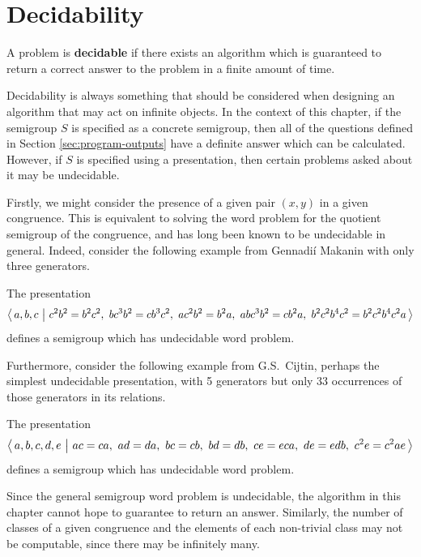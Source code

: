 \section{Decidability}
\label{sec:decidability}

\begin{definition}
  \label{def:decidable}
  A problem is \textbf{decidable} if there exists an algorithm which is
  guaranteed to return a correct answer to the problem in a finite amount of
  time.
\end{definition}

Decidability is always something that should be considered when designing an
algorithm that may act on infinite objects.  In the context of this chapter, if
the semigroup $S$ is specified as a concrete semigroup, then all of the
questions defined in Section \ref{sec:program-outputs} have a definite answer
which can be calculated.  However, if $S$ is specified using a presentation,
then certain problems asked about it may be undecidable.

Firstly, we might consider the presence of a given pair $(x,y)$ in a given
congruence.  This is equivalent to solving the word problem for the quotient
semigroup of the congruence, and has long been known to be undecidable in
general.  Indeed, consider the following example from Gennadi\'{i} Makanin with
only three generators.

\begin{example}[Makanin, 1966]
  \label{ex:makanin}
  The presentation
  $$\left\langle\,a,b,c ~\middle|~ c^2b^2 = b^2c^2,\ bc^3b^2 = cb^3c^2,\ ac^2b^2 = b^2a,\ abc^3b^2 = cb^2a,\ b^2c^2b^4c^2 = b^2c^2b^4c^2a\,\right\rangle$$
  defines a semigroup which has undecidable word problem.  \cite{makanin_1966}
\end{example}

Furthermore, consider the following example from G.S.~Cijtin, perhaps the
simplest undecidable presentation, with 5 generators but only 33 occurrences of
those generators in its relations.

\begin{example}[Cijtin, 1957]
  \label{ex:cijtin}
  The presentation
  $$\pres{a,b,c,d,e}{ac=ca,\ ad=da,\ bc=cb,\ bd=db,\ ce=eca,\ de=edb,\ c^2e=c^2ae}$$
  defines a semigroup which has undecidable word problem.  \cite{cijtin_1957, collins_1986}
\end{example}

Since the general semigroup word problem is undecidable, the algorithm in this
chapter cannot hope to guarantee to return an answer.  Similarly, the number of
classes of a given congruence and the elements of each non-trivial class may not
be computable, since there may be infinitely many.

